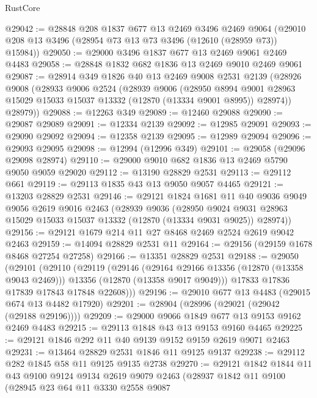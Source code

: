\begin{lexlean}{RustCore}
\begin{coremodule}
@29042 := @28848
    @208
    @1837
    @677
    @13
    @2469
    @3496
    @2469
    @9064
    (@29010 @208 @13 @3496 (@28954 @73 @13 @73 @3496 (@12610 (@28959 @73)) @15984))
@29050 := @29000 @3496 @1837 @677 @13 @2469 @9061 @2469 @4483
@29058 := @28848 @1832 @682 @1836 @13 @2469 @9010 @2469 @9061
@29087 := @28914
    @349
    @1826
    @40
    @13
    @2469
    @9008
    @2531
    @2139
    (@28926
      @9008
      (@28933
        @9006
        @2524
        (@28939
          @9006
          (@28950
            @8994
            @9001
            @28963
            @15029
            @15033
            @15037
            @13332
            (@12870 (@13334 @9001 @8995))
            @28974))
        @28979))
@29088 := @12263 @349
@29089 := @12460 @29088
@29090 := @29087 @29089
@29091 := @12334 @2139
@29092 := @12985 @29091
@29093 := @29090 @29092
@29094 := @12358 @2139
@29095 := @12989 @29094
@29096 := @29093 @29095
@29098 := @12994 (@12996 @349)
@29101 := @29058 (@29096 @29098 @28974)
@29110 := @29000 @9010 @682 @1836 @13 @2469 @5790 @9050 @9059 @29020
@29112 := @13190 @28829 @2531
@29113 := @29112 @661
@29119 := @29113 @1835 @43 @13 @9050 @9057 @4465
@29121 := @13203 @28829 @2531
@29146 := @29121
    @1824
    @1681
    @11
    @40
    @9036
    @9049
    @9056
    @2619
    @9016
    @2463
    (@28939
      @9036
      (@28950 @9024 @9031 @28963 @15029 @15033 @15037 @13332 (@12870 (@13334 @9031 @9025)) @28974))
@29156 := @29121 @1679 @214 @11 @27 @8468 @2469 @2524 @2619 @9042 @2463
@29159 := @14094 @28829 @2531 @11
@29164 := @29156 (@29159 @1678 @8468 @27254 @27258)
@29166 := @13351 @28829 @2531
@29188 := @29050
    (@29101
      (@29110
        (@29119
          (@29146
            (@29164 @29166 @13356 (@12870 (@13358 @9043 @2469)))
            @13356
            (@12870 (@13358 @9017 @9049)))
          @17833
          @17836
          @17839
          @17843
          @17848
          @22608)))
@29196 := @29010 @677 @13 @4483 (@29015 @674 @13 @4482 @17920)
@29201 := @28904 (@28996 (@29021 (@29042 (@29188 @29196))))
@29209 := @29000 @9066 @1849 @677 @13 @9153 @9162 @2469 @4483
@29215 := @29113 @1848 @43 @13 @9153 @9160 @4465
@29225 := @29121 @1846 @292 @11 @40 @9139 @9152 @9159 @2619 @9071 @2463
@29231 := @13464 @28829 @2531 @1846 @11 @9125 @9137
@29238 := @29112 @282 @1845 @58 @11 @9125 @9135 @2738
@29270 := @29121
    @1842
    @1844
    @11
    @43
    @9100
    @9124
    @9134
    @2619
    @9079
    @2463
    (@28937
      @1842
      @11
      @9100
      (@28945
        @23
        @64
        @11
        @3330
        @2558
        @9087

\end{coremodule}
\end{lexlean}
